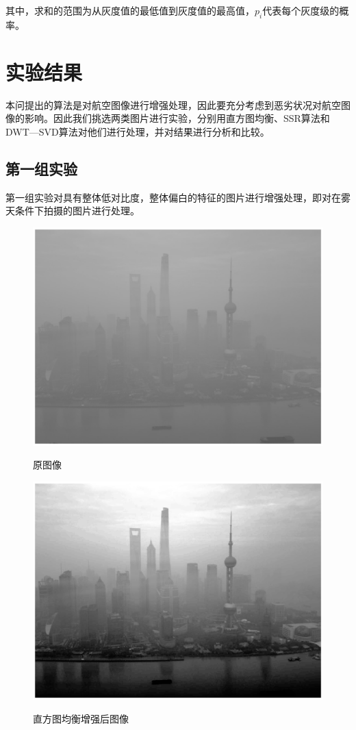 \documentclass[12pt]{book}
\begin{document}
其中，求和的范围为从灰度值的最低值到灰度值的最高值，$p_i$代表每个灰度级的概率。

		\section{实验结果}本问提出的算法是对航空图像进行增强处理，因此要充分考虑到恶劣状况对航空图像的影响。因此我们挑选两类图片进行实验，分别用直方图均衡、SSR算法和DWT—SVD算法对他们进行处理，并对结果进行分析和比较。
			\subsection{第一组实验}第一组实验对具有整体低对比度，整体偏白的特征的图片进行增强处理，即对在雾天条件下拍摄的图片进行处理。

				\begin{figure}[!ht]
					\begin{minipage}{0.48\linewidth}
						\centerline{\includegraphics[width=1\textwidth]{./figures/originalImage.eps}}
						\centerline{原图像}
					\end{minipage}
					\qquad
					\begin{minipage}{0.48\linewidth}
						\centerline{\includegraphics[width=1\textwidth]{./figures/HE11.eps}}
						\centerline{直方图均衡增强后图像}
					\end{minipage}


\end{figure}
\end{document}
